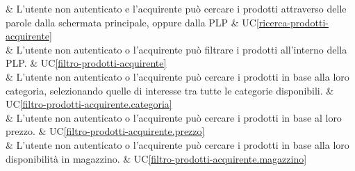  & L'utente non autenticato e l'acquirente può cercare i prodotti attraverso delle parole dalla schermata principale, oppure dalla PLP & UC\ref{ricerca-prodotti-acquirente} \\

 & L'utente non autenticato o l'acquirente può filtrare i prodotti all'interno della PLP. & UC\ref{filtro-prodotti-acquirente} \\

 & L'utente non autenticato o l'acquirente può cercare i prodotti in base alla loro categoria, selezionando quelle di interesse tra tutte le categorie disponibili. & UC\ref{filtro-prodotti-acquirente.categoria} \\

 & L'utente non autenticato o l'acquirente può cercare i prodotti in base al loro prezzo. & UC\ref{filtro-prodotti-acquirente.prezzo} \\

 & L'utente non autenticato o l'acquirente può cercare i prodotti in base alla loro disponibilità in magazzino. & UC\ref{filtro-prodotti-acquirente.magazzino} \\

